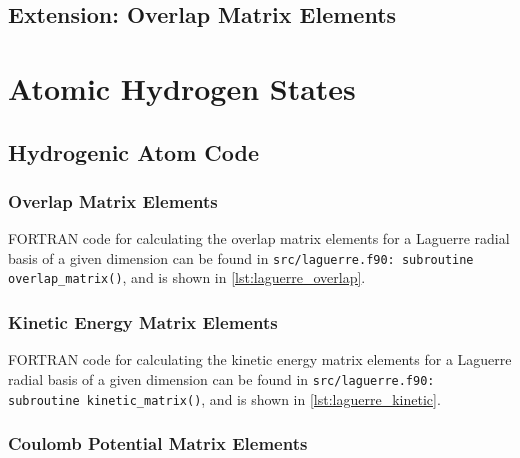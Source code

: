 \documentclass[]{article}
\begin{document}
\subsection{Extension: Overlap Matrix Elements}
\label{sec:extens-overl-matr}


\section{Atomic Hydrogen States}
\label{sec:atom-hydr-stat}

%

\subsection{Hydrogenic Atom Code}
\label{sec:hydrogenic-atom-code}

\subsubsection{Overlap Matrix Elements}
\label{sec:overl-matr-elem}

FORTRAN code for calculating the overlap matrix elements for a Laguerre radial
basis of a given dimension can be found in
\lstinline[style=ff]{src/laguerre.f90: }\lstinline{subroutine overlap_matrix()},
and is shown in \autoref{lst:laguerre_overlap}.



\subsubsection{Kinetic Energy Matrix Elements}
\label{sec:kinet-energy-matr-1}

FORTRAN code for calculating the kinetic energy matrix elements for a Laguerre
radial basis of a given dimension can be found in
\lstinline[style=ff]{src/laguerre.f90: }\lstinline{subroutine kinetic_matrix()},
and is shown in \autoref{lst:laguerre_kinetic}.



\subsubsection{Coulomb Potential Matrix Elements}
\label{sec:coulomb-potential-matr}
\end{document}
